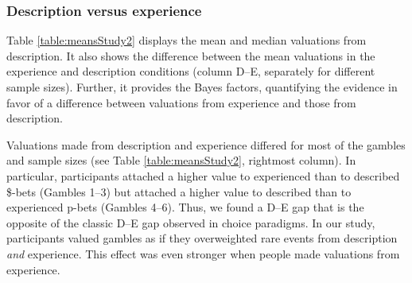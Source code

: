 \documentclass[a4paper, man, natbib, floatsintext]{apa6} %
\begin{document}


\subsubsection{Description versus experience}
Table \ref{table:meansStudy2} displays the mean and median valuations from description. It also shows the difference between the mean valuations in the experience and description conditions (column D--E, separately for different sample sizes). Further, it provides the Bayes factors, quantifying the evidence in favor of a difference between valuations from experience and those from description.


Valuations made from description and experience differed for most of the gambles and sample sizes (see Table \ref{table:meansStudy2}, rightmost column). In particular, participants attached a higher value to experienced than to described \$-bets (Gambles 1--3) but attached a higher value to described than to experienced p-bets (Gambles 4--6). Thus, we found a D--E gap that is the opposite of the classic D--E gap observed in choice paradigms. In our study, participants valued gambles as if they overweighted rare events from description \textit{and} experience. This effect was even stronger when people made valuations from experience.
\end{document}

